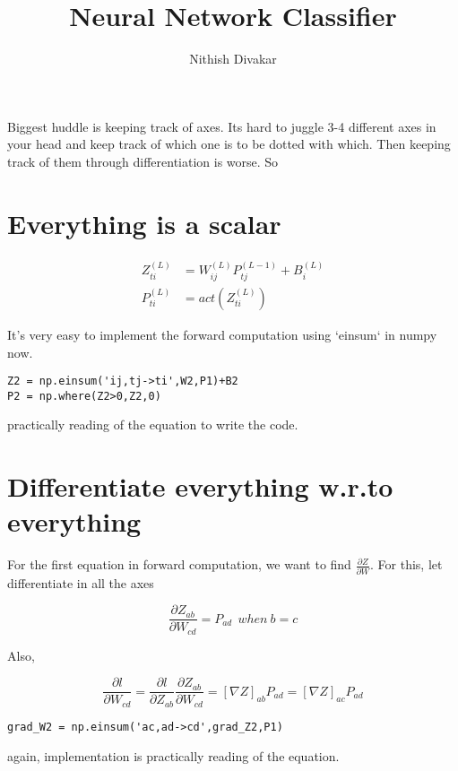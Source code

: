 \documentclass[12pt,crop=false,class=article,convert={density=300,outext=.compiled.png}]{standalone}
\title{\Huge Neural Network Classifier}
\date{}
\author{Nithish Divakar}
\begin{document}
\maketitle

Biggest huddle is keeping track of axes.  Its hard to juggle 3-4 different axes in your head and keep track of which one is to be dotted with which. Then keeping track of them through differentiation is worse. So 

\section*{Everything is a scalar}
\begin{align*}
Z^{(L)}_{ti} &= W^{(L)}_{ij}P^{(L-1)}_{tj}+B^{(L)}_{i}
\\
P^{(L)}_{ti} &= act(Z^{(L)}_{ti})
\end{align*}

It's very easy to implement the forward computation using `einsum` in numpy now. 

\begin{verbatim}
Z2 = np.einsum('ij,tj->ti',W2,P1)+B2
P2 = np.where(Z2>0,Z2,0)    
\end{verbatim}

practically reading of the equation to write the code. 

\section*{Differentiate everything w.r.to everything}
For the first equation in forward computation, we want to find $\frac{\partial Z}{\partial W}$. For this, let differentiate in all the axes

$$\frac{\partial Z_{ab}}{\partial W_{cd}} = P_{ad} ~~when~ b=c$$

Also,

$$\frac{\partial l}{\partial W_{cd}} = \frac{\partial l}{\partial Z_{ab}}\frac{\partial Z_{ab}}{\partial W_{cd}} = [\nabla Z]_{ab}P_{ad}= [\nabla Z]_{ac}P_{ad} $$

\begin{verbatim}
grad_W2 = np.einsum('ac,ad->cd',grad_Z2,P1)
\end{verbatim}

again, implementation is practically reading of the equation. 
\end{document}
